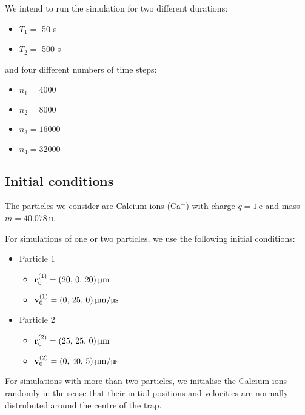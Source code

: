 We intend to run the simulation for two different durations:
\begin{itemize}
    \item[] $T_1 = $ 50 \textmu s
    \item[] $T_2 = $ 500 \textmu s
\end{itemize}
and four different numbers of time steps:
\begin{itemize}
    \item[] $n_1 = 4000$
    \item[] $n_2 = 8000$
    \item[] $n_3 = 16000$
    \item[] $n_4 = 32000$
\end{itemize}


\subsection{Initial conditions}\label{sec:initial_conditions}

The particles we consider are Calcium ions (Ca$^+$) with charge $q=1 \,\mathrm{e}$ and mass $m = 40.078 \,\mathrm{u}$. 

For simulations of one or two particles, we use the following initial conditions:
\begin{itemize}
    \item Particle 1\label{item:initial_conditions_p1}
    \begin{itemize}
        \item[] $\vec{r}^{(1)}_0 = (20, \,0, \,20) \, \mathrm{\text{\textmu}m} $
        \item[] $\vec{v}^{(1)}_0 = (0,\,25,\,0) \, \mathrm{\text{\textmu}m}/ \mathrm{\text{\textmu}s}$
    \end{itemize}
    \item Particle 2\label{item:initial_conditions_p2}
    \begin{itemize}
        \item[] $\vec{r}^{(2)}_0 = (25, \,25, \,0) \, \mathrm{\text{\textmu}m} $
        \item[] $\vec{v}^{(2)}_0 = (0,\,40,\,5) \, \mathrm{\text{\textmu}m}/ \mathrm{\text{\textmu}s}$
    \end{itemize}
\end{itemize}

For simulations with more than two particles, we initialise the Calcium ions randomly in the sense that their initial positions and velocities are normally distrubuted around the centre of the trap.





































